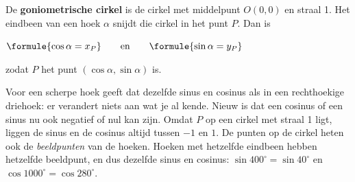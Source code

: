 \begin{theorie}
\begin{minipage}[t]{.6\linewidth}
\vspace{0pt}
De \textbf{\textcolor{accent}{goniometrische cirkel}} is de cirkel met middelpunt $O(0, 0)$ en straal 1. Het eindbeen van een hoek $\alpha$ snijdt die cirkel in het punt $P$. Dan is

\vspace{1mm}
\qquad $\formule{\cos\alpha = x_P} \qquad \text{en} \qquad \formule{\sin\alpha = y_P}$

\vspace{1mm}
zodat $P$ het punt $(\cos\alpha, \sin\alpha)$ is.
\end{minipage}\hfill
\begin{minipage}[t]{.36\linewidth}
\vspace{0pt}
\centering
{}
\end{minipage}
\end{theorie}

Voor een scherpe hoek geeft dat dezelfde sinus en cosinus als in een rechthoekige driehoek: er verandert niets aan wat je al kende. Nieuw is dat een cosinus of een sinus nu ook negatief of nul kan zijn. Omdat $P$ op een cirkel met straal 1 ligt, liggen de sinus en de cosinus altijd tussen $-1$ en $1$. De punten op de cirkel heten ook de \emph{beeldpunten} van de hoeken. Hoeken met hetzelfde eindbeen hebben hetzelfde beeldpunt, en dus dezelfde sinus en cosinus: $\sin 400^\circ = \sin 40^\circ$ en $\cos 1000^\circ = \cos 280^\circ$.

